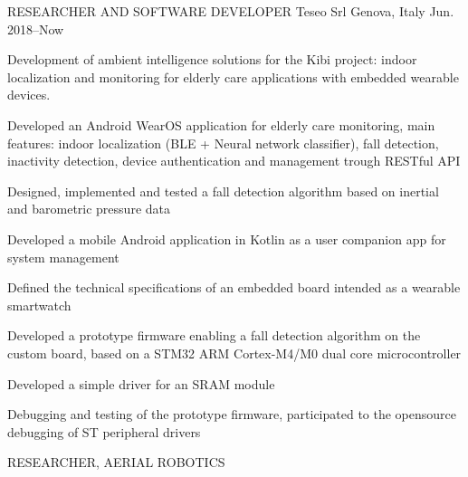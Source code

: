

\begin{cventries}

  \cventry
    {RESEARCHER AND SOFTWARE DEVELOPER} %
    {Teseo Srl} %
    {Genova, Italy} %
    {Jun. 2018--Now} %
    {
      \begin{cvparagraph}
      Development of ambient intelligence solutions for the Kibi project: indoor localization and monitoring for elderly care applications with embedded wearable devices.
      \end{cvparagraph}
      \begin{cvitems} %
        \item {Developed an Android WearOS application for elderly care monitoring, main features: indoor localization (BLE + Neural network classifier), fall detection, inactivity detection, device authentication and management trough RESTful API}
        \item {Designed, implemented and tested a fall detection algorithm based on inertial and barometric pressure data}
        \item {Developed a mobile Android application in Kotlin as a user companion app for system management}
        \item {Defined the technical specifications of an embedded board intended as a wearable smartwatch}
        \item {
          Developed a prototype firmware enabling a fall detection algorithm on the custom board, based on a STM32 ARM Cortex-M4/M0 dual core microcontroller
        }
        \item{Developed a simple driver for an SRAM module}
        \item{Debugging and testing of the prototype firmware, participated to the opensource debugging of ST peripheral drivers} 
      \end{cvitems}
    }
  \cventry
    {RESEARCHER, AERIAL ROBOTICS} %

\end{cventries}
